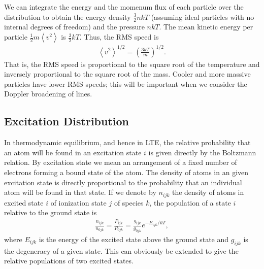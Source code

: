 We can integrate the energy and the momenum flux of each particle over
the distribution to obtain the energy density $\frac{3}{2}nkT$ (assuming
ideal particles with no internal degrees of freedom) and the pressure
$nkT$. The mean kinetic energy per particle
$\frac{1}{2}m\left<v^2\right>$ is $\frac{3}{2}kT$. Thus, the RMS speed
is
\begin{align}
\left<v^2\right>^{1/2} = \left(\frac{3kT}{m}\right)^{1/2}.
\end{align}
That is, the RMS speed is proportional to the square root of the
temperature and inversely proportional to the square root of the mass.
Cooler and more massive particles have lower RMS speeds; this will be
important when we consider the Doppler broadening of lines.

\newslide

\subsection{Excitation Distribution}

In thermodynamic equilibrium, and hence in LTE, the relative probability
that an atom will be found in an excitation state $i$ is given directly
by the Boltzmann relation. By excitation state we mean an arrangement of
a fixed number of electrons forming a bound state of the atom. The
density of atoms in an given excitation state is directly proportional
to the probability that an individual atom will be found in that state.
If we denote by $n_{ijk}$ the density of atoms in excited state $i$ of
ionization state $j$ of species $k$, the population of a
state $i$ relative to the ground state is
\begin{align}
\frac{n_{ijk}}{n_{0jk}}
=
\frac{P_{ijk}}{P_{0jk}}
=
\frac{g_{ijk}}{g_{0jk}}e^{-E_{ijk}/kT},
\end{align}
where $E_{ijk}$ is the energy of the excited state above the
ground state and $g_{ijk}$ is the degeneracy of a given
state. This can obviously be extended to give the relative
populations of two excited states.

